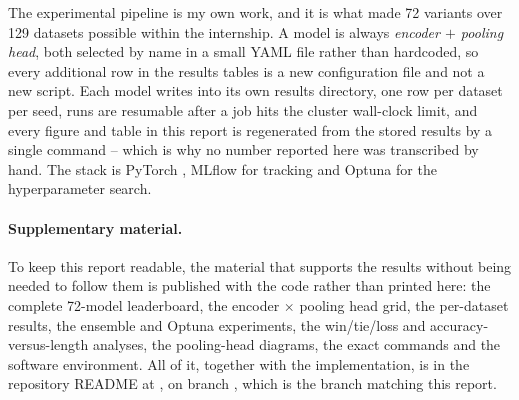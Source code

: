 \begin{contribution}
The experimental pipeline is my own work, and it is what made 72 variants over 129 datasets possible
within the internship. A model is always \emph{encoder $+$ pooling head}, both selected by name in a
small YAML file rather than hardcoded, so every additional row in the results tables is a new
configuration file and not a new script. Each model writes into its own results directory, one row
per dataset per seed, runs are resumable after a job hits the cluster wall-clock limit, and every
figure and table in this report is regenerated from the stored results by a single command --
which is why no number reported here was transcribed by hand. The stack is PyTorch
\citep{paszke2019pytorch}, MLflow for tracking and Optuna \citep{akiba2019optuna} for the
hyperparameter search.
\end{contribution}

\paragraph{Supplementary material.}
To keep this report readable, the material that supports the results without being needed to follow
them is published with the code rather than printed here: the complete 72-model leaderboard, the
encoder $\times$ pooling head grid, the per-dataset \ucr{} results, the ensemble and Optuna
experiments, the win/tie/loss and accuracy-versus-length analyses, the pooling-head diagrams, the
exact commands and the software environment. All of it, together with the implementation, is in the
repository README at \repolink{}, on branch \repobranch{}, which is the branch matching this report.
